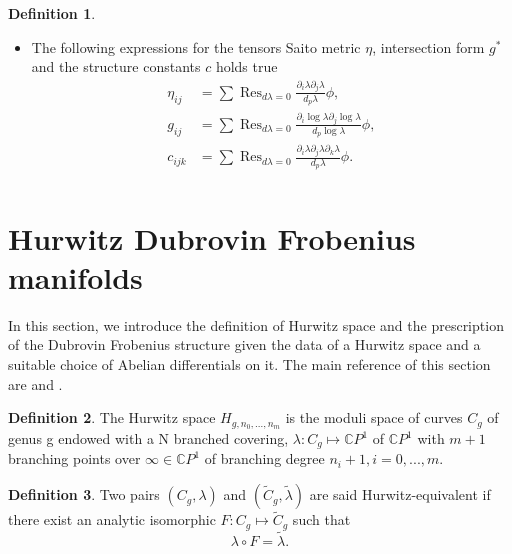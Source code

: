 \documentclass{article}
\theoremstyle{definition}
\DeclareMathOperator*{\res}{Res}
\newtheorem{definition}{Definition}[section]
\begin{document}
\begin{definition}
\begin{itemize}
\item 
The following expressions for the tensors  Saito metric $\eta$,  intersection form $g^{*}$ and the structure constants $c$ holds true
\begin{equation}\label{residue expression for eta, intersection form and structure constants}
\begin{split}
\eta_{ij}&=\sum \res_{d\lambda=0}   \frac{ \partial_i\lambda  \partial_j\lambda }{d_p\lambda        }\phi, \\
g_{ij}&=\sum \res_{d\lambda=0}  \frac{ \partial_i\log\lambda  \partial_j\log\lambda }{d_p\log\lambda        } \phi,\\
c_{ijk}&=\sum \res_{d\lambda=0}   \frac{ \partial_i\lambda  \partial_j\lambda  \partial_k\lambda  }{d_p\lambda        }\phi.\\
\end{split}
\end{equation}
\end{itemize}



\end{definition}




\section{Hurwitz Dubrovin Frobenius manifolds}

In this section, we introduce the definition of Hurwitz space and the prescription of the Dubrovin Frobenius structure given the data of a Hurwitz space and a suitable choice of Abelian differentials on it. The main reference of this section are \cite{B. Dubrovin2} and \cite{V. Shramchenko}.\\

\begin{definition}
The Hurwitz space $H_{g,n_0 ,...,n_m}$ is the moduli space of curves $C_g$ of genus g
endowed with a N branched covering, $ \lambda: C_g\mapsto \mathbb{C}P ^1$ of $\mathbb{C}P^1$ with $m + 1$ branching points
over $\infty\in \mathbb{C}P^1$ of branching degree $n_i + 1, i = 0, . . . , m.$
\end{definition}

\begin{definition}
Two pairs $(C_g,\lambda)$ and $(\tilde C_g,\tilde\lambda)$ are said Hurwitz-equivalent if there exist an analytic isomorphic $F:C_g\mapsto \tilde C_g$ such that 
\begin{equation*}
\lambda\circ F =\tilde\lambda.
\end{equation*}
\end{definition}
\end{document}
